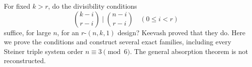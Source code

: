 For fixed $k>r$, do the divisibility conditions
\[
 \binom{k-i}{r-i}\mid\binom{n-i}{r-i}\quad(0\leq i<r)
\]
suffice, for large $n$, for an $r$-$(n,k,1)$ design? Keevash proved that they do. Here we prove the conditions and construct several exact families, including every Steiner triple system order $n\equiv3\pmod6$. The general absorption theorem is not reconstructed.

